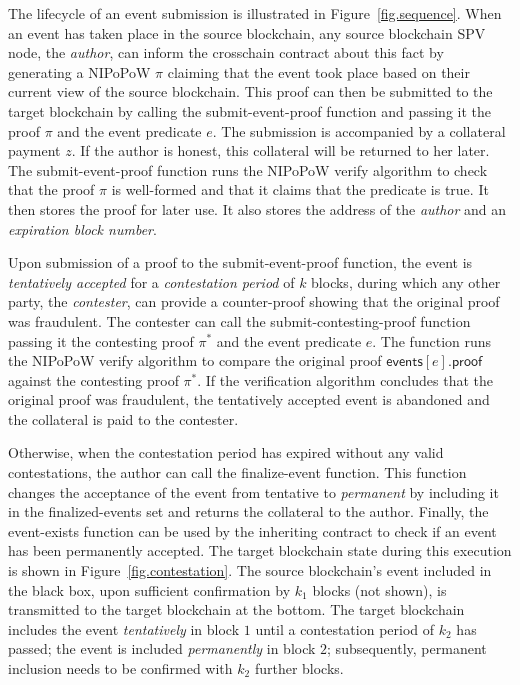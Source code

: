 The lifecycle of an event submission is illustrated in
Figure~\ref{fig.sequence}. When an event has taken place in the source
blockchain, any source blockchain SPV node, the \emph{author}, can inform the
\textsf{crosschain} contract about this fact by generating a NIPoPoW $\pi$
claiming that the event took place based on their current view of the source
blockchain. This proof can then be submitted to the target blockchain by calling
the \textsf{submit-event-proof} function and passing it the proof $\pi$ and the
event predicate $e$. The submission is accompanied by a collateral payment $z$.
If the author is honest, this collateral will be returned to her later. The
\textsf{submit-event-proof} function runs the NIPoPoW \textsf{verify} algorithm
to check that the proof $\pi$ is well-formed and that it claims that the
predicate is \textsf{true}. It then stores the proof for later use. It also
stores the address of the \emph{author} and an \emph{expiration block number}.

Upon submission of a proof to the \textsf{submit-event-proof} function, the
event is \emph{tentatively accepted} for a \emph{contestation period} of $k$
blocks, during which any other party, the \emph{contester}, can provide a
counter-proof showing that the original proof was fraudulent. The contester can
call the \textsf{submit-contesting-proof} function passing it the contesting
proof $\pi^*$ and the event predicate $e$. The function runs the NIPoPoW
\textsf{verify} algorithm to compare the original proof
$\textsf{events}[e].\textsf{proof}$ against the contesting proof $\pi^*$. If the
verification algorithm concludes that the original proof was fraudulent, the
tentatively accepted event is abandoned and the collateral is paid to the
contester.

Otherwise, when the contestation period has expired without any valid
contestations, the author can call the \textsf{finalize-event} function. This
function changes the acceptance of the event from tentative to \emph{permanent}
by including it in the \textsf{finalized-events} set and returns the collateral
to the author. Finally, the \textsf{event-exists} function can be used by the
inheriting contract to check if an event has been permanently accepted. The
target blockchain state during this execution is shown in
Figure~\ref{fig.contestation}. The source blockchain's event included in the
black box, upon sufficient confirmation by $k_1$ blocks (not shown), is
transmitted to the target blockchain at the bottom. The target blockchain
includes the event \emph{tentatively} in block $1$ until a contestation period
of $k_2$ has passed; the event is included \emph{permanently} in block $2$;
subsequently, permanent inclusion needs to be confirmed with $k_2$ further
blocks.

